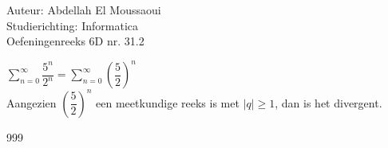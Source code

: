 \documentclass[a4paper]{article}
\begin{document}
  
\noindent \large Auteur: Abdellah El Moussaoui \\
\noindent \large Studierichting: Informatica\\
\noindent \large Oefeningenreeks 6D nr. 31.2\\

\medskip

\normalsize


$\displaystyle\sum_{n=0}^{\infty}\dfrac{5^n}{2^n} = \displaystyle\sum_{n=0}^{\infty} \left(\dfrac{5}{2}\right)^n$\\

Aangezien $\left(\dfrac{5}{2}\right)^n$ een meetkundige reeks is met $|q|\geq1$, dan is het divergent.


\begin{thebibliography}{999}
\end{thebibliography}
\end{document}
